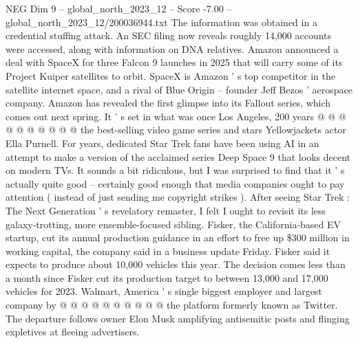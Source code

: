 \begin{textsample}{NEG Dim 9 – global\_north\_2023\_12 – Score -7.00 – global\_north\_2023\_12/200036944.txt}
The information was obtained in a credential stuffing attack.
An SEC filing now reveals roughly 14,000 accounts were accessed, along with information on DNA relatives.
Amazon announced a deal with SpaceX for three Falcon 9 launches in 2025 that will carry some of its Project Kuiper satellites to orbit.
SpaceX is Amazon ' s top competitor in the satellite internet space, and a rival of Blue Origin -- founder Jeff Bezos ' aerospace company.
Amazon has revealed the first glimpse into its Fallout series, which comes out next spring.
It ' s set in what was once Los Angeles, 200 years @ @ @ @ @ @ @ @ @ @ the best-selling video game series and stars Yellowjackets actor Ella Purnell.
For years, dedicated Star Trek fans have been using AI in an attempt to make a version of the acclaimed series Deep Space 9 that looks decent on modern TVs.
It sounds a bit ridiculous, but I was surprised to find that it ' s actually quite good -- certainly good enough that media companies ought to pay attention ( instead of just sending me copyright strikes ).
After seeing Star Trek : The Next Generation ' s revelatory remaster, I felt I ought to revisit its less galaxy-trotting, more ensemble-focused sibling.
Fisker, the California-based EV startup, cut its annual production guidance in an effort to free up \$300 million in working capital, the company said in a business update Friday.
Fisker said it expects to produce about 10,000 vehicles this year.
The decision comes less than a month since Fisker cut its production target to between 13,000 and 17,000 vehicles for 2023.
Walmart, America ' s single biggest employer and largest company by @ @ @ @ @ @ @ @ @ @ the platform formerly known as Twitter.
The departure follows owner Elon Musk amplifying antisemitic posts and flinging expletives at fleeing advertisers.

\end{textsample}
